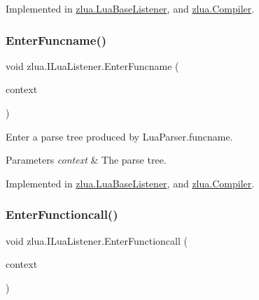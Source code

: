 Implemented in \mbox{\hyperlink{classzlua_1_1_lua_base_listener_a3e3c9ea85f3429d18fb56ed19476c5d3}{zlua.\+Lua\+Base\+Listener}}, and \mbox{\hyperlink{classzlua_1_1_compiler_a0ccbdaa518f36c6a9145c36adf12dd2e}{zlua.\+Compiler}}.

\mbox{\label{interfacezlua_1_1_i_lua_listener_a17d342070a88fadc98dec2456e2ba0dc}} 
\subsubsection{\texorpdfstring{Enter\+Funcname()}{EnterFuncname()}}
{\footnotesize\ttfamily void zlua.\+I\+Lua\+Listener.\+Enter\+Funcname (\begin{DoxyParamCaption}\item[{\mbox{[}\+Not\+Null\mbox{]} \mbox{\hyperlink{classzlua_1_1_lua_parser_1_1_funcname_context}{Lua\+Parser.\+Funcname\+Context}}}]{context }\end{DoxyParamCaption})}



Enter a parse tree produced by Lua\+Parser.\+funcname. 


\begin{DoxyParams}{Parameters}
{\em context} & The parse tree.\\
\hline
\end{DoxyParams}


Implemented in \mbox{\hyperlink{classzlua_1_1_lua_base_listener_adae5a9d925d77bceb832b62f7ce47766}{zlua.\+Lua\+Base\+Listener}}, and \mbox{\hyperlink{classzlua_1_1_compiler_a0da2d547d2333616052b776e192eaae5}{zlua.\+Compiler}}.

\mbox{\label{interfacezlua_1_1_i_lua_listener_aed7b99a3790f95b4b5e3d7cac6d3361d}} 
\subsubsection{\texorpdfstring{Enter\+Functioncall()}{EnterFunctioncall()}}
{\footnotesize\ttfamily void zlua.\+I\+Lua\+Listener.\+Enter\+Functioncall (\begin{DoxyParamCaption}\item[{\mbox{[}\+Not\+Null\mbox{]} \mbox{\hyperlink{classzlua_1_1_lua_parser_1_1_functioncall_context}{Lua\+Parser.\+Functioncall\+Context}}}]{context }\end{DoxyParamCaption})}



